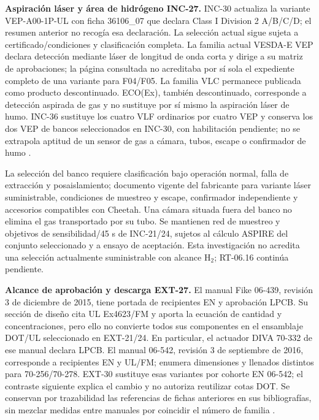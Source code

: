 \textbf{Aspiración láser y área de hidrógeno INC-27.}\label{sec:sd4-inc27}
INC-30 actualiza la variante VEP-A00-1P-UL con ficha 36106\_07 que declara Class I Division 2 A/B/C/D; el resumen anterior no recogía esa declaración. La selección actual sigue sujeta a certificado/condiciones y clasificación completa. La familia actual VESDA-E VEP declara detección mediante láser de longitud de onda corta y dirige a su matriz de aprobaciones; la página consultada no acreditaba por sí sola el expediente completo de una variante para F04/F05. La familia VLC permanece publicada como producto descontinuado. ECO(Ex), también descontinuado, corresponde a detección aspirada de gas y no sustituye por sí mismo la aspiración láser de humo. INC-36 sustituye los cuatro VLF ordinarios por cuatro VEP y conserva los dos VEP de bancos seleccionados en INC-30, con habilitación pendiente; no se extrapola aptitud de un sensor de gas a cámara, tubos, escape o confirmador de humo \parencites{l27-xtralis-vep,l27-xtralis-vlc,l27-xtralis-ecoex}.

La selección del banco requiere clasificación bajo operación normal, falla de extracción y posaislamiento; documento vigente del fabricante para variante láser suministrable, condiciones de muestreo y escape, confirmador independiente y accesorios compatibles con Cheetah. Una cámara situada fuera del banco no elimina el gas transportado por su tubo. Se mantienen red de muestreo y objetivos de sensibilidad/45 s de INC-21/24, sujetos al cálculo ASPIRE del conjunto seleccionado y a ensayo de aceptación. Esta investigación no acredita una selección actualmente suministrable con alcance H$_2$; RT-06.16 continúa pendiente.

\textbf{Alcance de aprobación y descarga EXT-27.}\label{sec:sd4-ext27}
El manual Fike 06-439, revisión 3 de diciembre de 2015, tiene portada de recipientes EN y aprobación LPCB. Su sección de diseño cita UL Ex4623/FM y aporta la ecuación de cantidad y concentraciones, pero ello no convierte todos sus componentes en el ensamblaje DOT/UL seleccionado en EXT-21/24. En particular, el actuador DIVA 70-332 de ese manual declara LPCB. El manual 06-542, revisión 3 de septiembre de 2016, corresponde a recipientes EN y UL/FM; enumera dimensiones y llenados distintos para 70-256/70-278. EXT-30 sustituye esas variantes por cohorte EN 06-542; el contraste siguiente explica el cambio y no autoriza reutilizar cotas DOT. Se conservan por trazabilidad las referencias de fichas anteriores en sus bibliografías, sin mezclar medidas entre manuales por coincidir el número de familia \parencites[portada; ficha~06-698-1-2, p.~1; sec.~2, p.~1]{l27-fike-439}[portada; ficha~06-542-1-2, p.~1]{l27-fike-542}.

